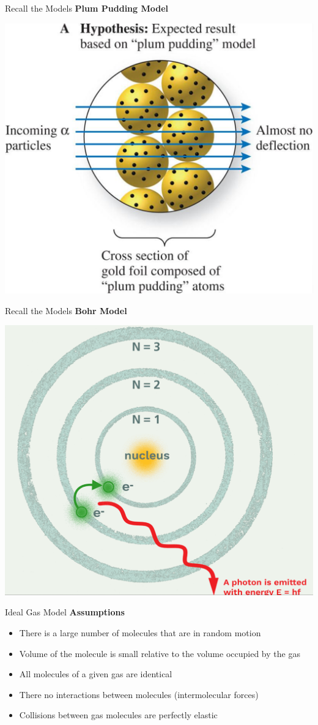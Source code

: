 \documentclass[11pt]{beamer}
\begin{document}
\begin{frame}{Recall the Models}
  \textbf{Plum Pudding Model}
  \centering
  
  \includegraphics[width=0.7\linewidth]{test_hypothesis}
\end{frame}

\begin{frame}{Recall the Models}
  \centering
  \textbf{Bohr Model}

  \includegraphics[width=0.7\linewidth]{bohr_model}
\end{frame}

\begin{frame}{Ideal Gas Model}
  \textbf{Assumptions}
  \begin{itemize}
  \item There is a large number of molecules that are
    in random motion
  \item Volume of the molecule is small relative to the volume occupied
    by the gas
  \item All molecules of a given gas are identical
  \item There no interactions between molecules (intermolecular forces)
  \item Collisions between gas molecules are perfectly elastic
  \end{itemize}
\end{frame}
\end{document}
